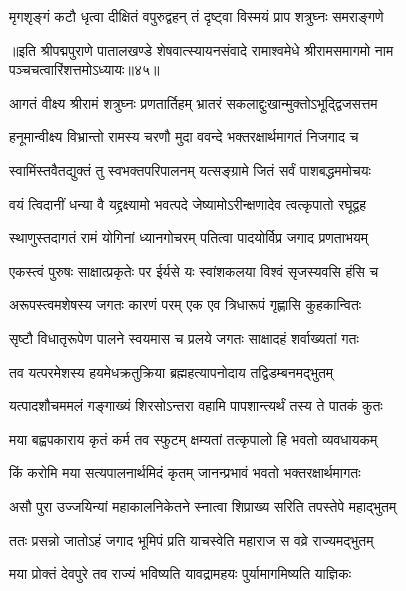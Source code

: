 \twolineshloka
{मृगशृङ्गं कटौ धृत्वा दीक्षितं वपुरुद्वहन्}
{तं दृष्ट्वा विस्मयं प्राप शत्रुघ्नः समराङ्गणे}%

{॥इति श्रीपद्मपुराणे पातालखण्डे शेषवात्स्यायनसंवादे रामाश्वमेधे श्रीरामसमागमो नाम पञ्चचत्वारिंशत्तमोऽध्यायः॥४५॥}



\twolineshloka
{आगतं वीक्ष्य श्रीरामं शत्रुघ्नः प्रणतार्तिहम्}
{भ्रातरं सकलाद्दुःखान्मुक्तोऽभूद्द्विजसत्तम}%

\twolineshloka
{हनूमान्वीक्ष्य विभ्रान्तो रामस्य चरणौ मुदा}
{ववन्दे भक्तरक्षार्थमागतं निजगाद च}%

\twolineshloka
{स्वामिंस्तवैतद्युक्तं तु स्वभक्तपरिपालनम्}
{यत्सङ्ग्रामे जितं सर्वं पाशबद्धममोचयः}%

\twolineshloka
{वयं त्विदानीं धन्या वै यद्द्रक्ष्यामो भवत्पदे}
{जेष्यामोऽरीन्क्षणादेव त्वत्कृपातो रघूद्वह}%


\twolineshloka
{स्थाणुस्तदागतं रामं योगिनां ध्यानगोचरम्}
{पतित्वा पादयोर्विप्र जगाद प्रणताभयम्}%

\twolineshloka
{एकस्त्वं पुरुषः साक्षात्प्रकृतेः पर ईर्यसे}
{यः स्वांशकलया विश्वं सृजस्यवसि हंसि च}%

\twolineshloka
{अरूपस्त्वमशेषस्य जगतः कारणं परम्}
{एक एव त्रिधारूपं गृह्णासि कुहकान्वितः}%

\twolineshloka
{सृष्टौ विधातृरूपेण पालने स्वयमास च}
{प्रलये जगतः साक्षादहं शर्वाख्यतां गतः}%

\twolineshloka
{तव यत्परमेशस्य हयमेधक्रतुक्रिया}
{ब्रह्महत्यापनोदाय तद्विडम्बनमद्भुतम्}%

\twolineshloka
{यत्पादशौचममलं गङ्गाख्यं शिरसोऽन्तरा}
{वहामि पापशान्त्यर्थं तस्य ते पातकं कुतः}%

\twolineshloka
{मया बह्वपकाराय कृतं कर्म तव स्फुटम्}
{क्षम्यतां तत्कृपालो हि भवतो व्यवधायकम्}%

\twolineshloka
{किं करोमि मया सत्यपालनार्थमिदं कृतम्}
{जानन्प्रभावं भवतो भक्तरक्षार्थमागतः}%

\twolineshloka
{असौ पुरा उज्जयिन्यां महाकालनिकेतने}
{स्नात्वा शिप्राख्य सरिति तपस्तेपे महाद्भुतम्}%

\twolineshloka
{ततः प्रसन्नो जातोऽहं जगाद भूमिपं प्रति}
{याचस्वेति महाराज स वव्रे राज्यमद्भुतम्}%

\twolineshloka
{मया प्रोक्तं देवपुरे तव राज्यं भविष्यति}
{यावद्रामहयः पुर्यामागमिष्यति याज्ञिकः}%


